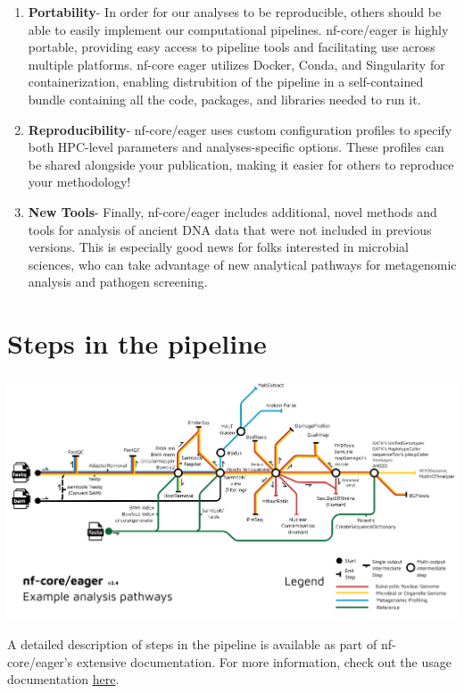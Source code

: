 \documentclass[
  letterpaper,
]{book}
\providecommand{\tightlist}{%
  \setlength{\itemsep}{0pt}\setlength{\parskip}{0pt}}\usepackage{longtable,booktabs,array}
\begin{document}
\begin{enumerate}
\def\labelenumi{\arabic{enumi}.}
\tightlist
\item
  \textbf{Portability}- In order for our analyses to be reproducible,
  others should be able to easily implement our computational pipelines.
  nf-core/eager is highly portable, providing easy access to pipeline
  tools and facilitating use across multiple platforms. nf-core eager
  utilizes Docker, Conda, and Singularity for containerization, enabling
  distrubition of the pipeline in a self-contained bundle containing all
  the code, packages, and libraries needed to run it.
\item
  \textbf{Reproducibility}- nf-core/eager uses custom configuration
  profiles to specify both HPC-level parameters and analyses-specific
  options. These profiles can be shared alongside your publication,
  making it easier for others to reproduce your methodology!
\item
  \textbf{New Tools}- Finally, nf-core/eager includes additional, novel
  methods and tools for analysis of ancient DNA data that were not
  included in previous versions. This is especially good news for folks
  interested in microbial sciences, who can take advantage of new
  analytical pathways for metagenomic analysis and pathogen screening.
\end{enumerate}

\hypertarget{steps-in-the-pipeline}{%
\section{Steps in the pipeline}\label{steps-in-the-pipeline}}

\includegraphics{assets/images/chapters/ancient-metagenomic-pipelines/eager2_metromap_complex.png}

A detailed description of steps in the pipeline is available as part of
nf-core/eager's extensive documentation. For more information, check out
the usage documentation \href{https://nf-co.re/eager/2.4.5/usage}{here}.
\end{document}
